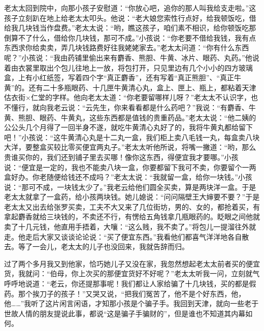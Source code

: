 \documentclass[12pt,UTF8]{ctexbook}
\begin{document}
老太太回到院中，向那小孩子安慰道：“你放心吧，追你的那人叫我给支走啦。”这孩子立刻趴在地上给老太太叩头。他说：“老大娘您索性行点好，给我顿饭吃，借给我几块钱当作盘费。”老太太说：“哟，瞧这孩子，咱们素不相识，给你顿饭吃那倒算不了什么，借给你几块钱，那可不成。”小孩说：“你老要不借给我钱，我有点东西求你给卖卖，弄几块钱路费好往我姥姥家去。”老太太问道：“你有什么东西呢？”小孩说：“我由药铺里偷出来有麝香、熊胆、牛黄、冰片、眼药、丸药。”他说着由衣裳里取出个包儿往地上一放，将包打开，只见里边有几个小小的四方玻璃盒，上有小红纸签，写着四个字“真正麝香”，还有写着“真正熊胆”、“真正牛黄”的。还有二十多瓶眼药、十几匣牛黄清心丸，盒上、匣上、瓶上，都粘着天津估衣街×仁堂的字样。他向老太太道：“你老要留哪样儿呀？”老太太不认识字，也不懂行，就向我老云说：“云先生，你来看看都是什么药吧？”我说：“有麝香、牛黄、熊胆、眼药、牛黄丸，这些东西都是值钱的贵重药品。”老太太说：“他二姨的公公头几个月得了一回半身不遂，就吃牛黄清心丸好了的，我将牛黄丸都给留下吧！”小孩说：“这牛黄清心丸是十二丸一盒，我们柜上卖八毛钱一丸，每盒卖八块大洋，要整盒买较比零买便宜两丸子。”老太太听他所说，将嘴一撇道：“哟，那么贵谁买你的，我们还到铺子里去买哪！像你这东西，得便宜我才要哪。”小孩说：“便宜是一定的，我也不能卖八块一盒，你要都留下我可不卖，你要留个一两盒好办。你老随便给钱还不成吗？”老太太说：“我就留一盒，给你一块钱。”小孩说：“那可不成，一块钱太少了。”我老云给他们圆全买卖，算是两块洋一盒。于是老太太就拿了一盒药，给小孩两块钱。她儿媳说：“问问隔壁王大婶要不要？”于是老太太又出去给张罗买卖，工夫不大又来了几位街坊，男的、女的，都抢着买，有拿起麝香就给三块钱的，不卖还不行，有愣给五角钱拿几瓶眼药的。眨眼之间他就卖了十几元钱，他直用手捂着，大嚷：“这么贱，我不卖了。”将包儿一提溜往外就走。他走后大家又谈谈论论说：“买了便宜东西。”我看他们都喜气洋洋地各自散去。等了一会儿，老太太的儿子也没回来，我就告辞而归。

过了两个多月我又到他家，恰巧她儿子又没在家，我忽然想起老太太前者买的便宜货，我就问：“伯母，你上次买的那便宜货好不好呢？”老太太听我一问，立刻就气呼呼地说道：“老云，你还提那事呢！我们都让人家给骗了十几块钱，买的都是假药。那个挨刀子的孩子！”又哭又说，“把我们冤苦了，他不是个好东西，他，他……”我听了这片闲言闲语，才知那小孩是个骗子手。我回到天津，就向一些老于世故人情的朋友提说此事，都说“这是骗子手骗财的”，但是谁也不知道其内幕如何。
\end{document}
